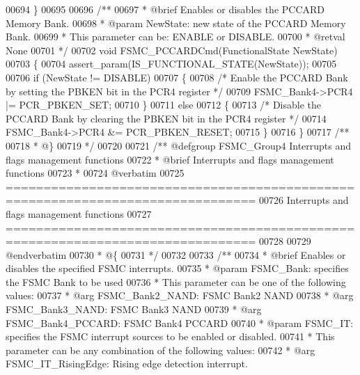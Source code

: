 \begin{DoxyCode}
00694 \}
00695 
00696 \textcolor{comment}{/**}
00697 \textcolor{comment}{  * @brief  Enables or disables the PCCARD Memory Bank.}
00698 \textcolor{comment}{  * @param  NewState: new state of the PCCARD Memory Bank.  }
00699 \textcolor{comment}{  *          This parameter can be: ENABLE or DISABLE.}
00700 \textcolor{comment}{  * @retval None}
00701 \textcolor{comment}{  */}
00702 \textcolor{keywordtype}{void} FSMC_PCCARDCmd(FunctionalState NewState)
00703 \{
00704   assert_param(IS\_FUNCTIONAL\_STATE(NewState));
00705 
00706   \textcolor{keywordflow}{if} (NewState != DISABLE)
00707   \{
00708     \textcolor{comment}{/* Enable the PCCARD Bank by setting the PBKEN bit in the PCR4 register */}
00709     FSMC_Bank4->PCR4 |= PCR_PBKEN_SET;
00710   \}
00711   \textcolor{keywordflow}{else}
00712   \{
00713     \textcolor{comment}{/* Disable the PCCARD Bank by clearing the PBKEN bit in the PCR4 register */}
00714     FSMC_Bank4->PCR4 &= PCR_PBKEN_RESET;
00715   \}
00716 \}
00717 \textcolor{comment}{/**}
00718 \textcolor{comment}{  * @\}}
00719 \textcolor{comment}{  */}
00720 
00721 \textcolor{comment}{/** @defgroup FSMC\_Group4  Interrupts and flags management functions}
00722 \textcolor{comment}{ *  @brief    Interrupts and flags management functions}
00723 \textcolor{comment}{ *}
00724 \textcolor{comment}{@verbatim   }
00725 \textcolor{comment}{ ===============================================================================}
00726 \textcolor{comment}{                     Interrupts and flags management functions}
00727 \textcolor{comment}{ ===============================================================================  }
00728 \textcolor{comment}{}
00729 \textcolor{comment}{@endverbatim}
00730 \textcolor{comment}{  * @\{}
00731 \textcolor{comment}{  */}
00732 
00733 \textcolor{comment}{/**}
00734 \textcolor{comment}{  * @brief  Enables or disables the specified FSMC interrupts.}
00735 \textcolor{comment}{  * @param  FSMC\_Bank: specifies the FSMC Bank to be used}
00736 \textcolor{comment}{  *          This parameter can be one of the following values:}
00737 \textcolor{comment}{  *            @arg FSMC\_Bank2\_NAND: FSMC Bank2 NAND }
00738 \textcolor{comment}{  *            @arg FSMC\_Bank3\_NAND: FSMC Bank3 NAND}
00739 \textcolor{comment}{  *            @arg FSMC\_Bank4\_PCCARD: FSMC Bank4 PCCARD}
00740 \textcolor{comment}{  * @param  FSMC\_IT: specifies the FSMC interrupt sources to be enabled or disabled.}
00741 \textcolor{comment}{  *          This parameter can be any combination of the following values:}
00742 \textcolor{comment}{  *            @arg FSMC\_IT\_RisingEdge: Rising edge detection interrupt. }

\end{DoxyCode}
